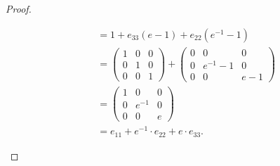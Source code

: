\documentclass[12pt]{article}
\theoremstyle{definition}
\begin{document}
\begin{proof}
\begin{enumerate}[label=(\alph*)]
\begin{align*}
			                            & = 1 + e_{33}(e - 1) + e_{22}(e^{-1}-1)                                                                                                             \\
			                            & = \begin{pmatrix} 1 & 0 & 0 \\ 0 & 1 & 0 \\ 0 & 0 & 1 \end{pmatrix} + \begin{pmatrix} 0 & 0 & 0 \\ 0 & e^{-1} - 1 & 0 \\ 0 & 0 & e-1 \end{pmatrix} \\
			                            & = \begin{pmatrix} 1 & 0 & 0 \\ 0 & e^{-1} & 0 \\ 0 & 0 & e \end{pmatrix}                                                                           \\
			                            & = e_{11} + e^{-1}\cdot e_{22} + e\cdot e_{33}.
		      \end{align*}
	\end{enumerate}
\end{proof}
\end{document}

